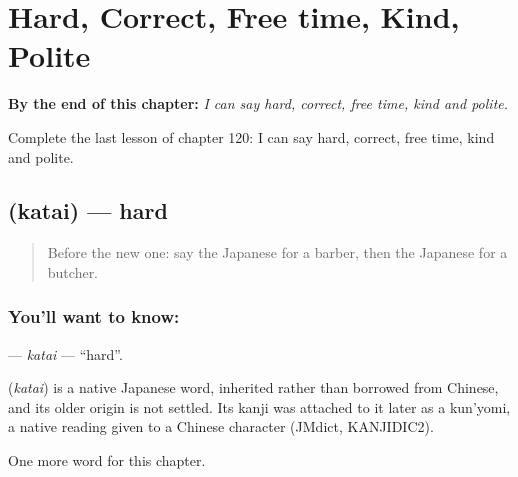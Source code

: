 
\chapter{Hard, Correct, Free time, Kind, Polite}
\label{ch:ja-hard-correct-free-time-kind-polite}

\begin{chapteropening}
\textbf{By the end of this chapter:} \emph{I can say hard, correct, free time, kind and polite.}

Complete the last lesson of chapter 120: I can say hard, correct, free time, kind and polite.
\end{chapteropening}

\section[\texorpdfstring{\ja{かたい} (katai)}{かたい (katai)}]{ (katai) — hard}

\label{lesson:JA-C120-katai}



\begin{quote}
Before the new one: say the Japanese for a barber, then the Japanese for a butcher.
\end{quote}

\subsection*{You'll want to know: }
\textbf{} — \emph{katai} — \textquotedblleft{}hard\textquotedblright{}.

\begin{cousinweb}
\textbf{} (\emph{katai}) is a native Japanese word, inherited rather than borrowed from Chinese, and its older origin is not settled. Its kanji was attached to it later as a kun'yomi, a native reading given to a Chinese character (JMdict, KANJIDIC2).
\end{cousinweb}

\begin{grammarlens}[title={What you've built}]
One more word for this chapter.
\end{grammarlens}

